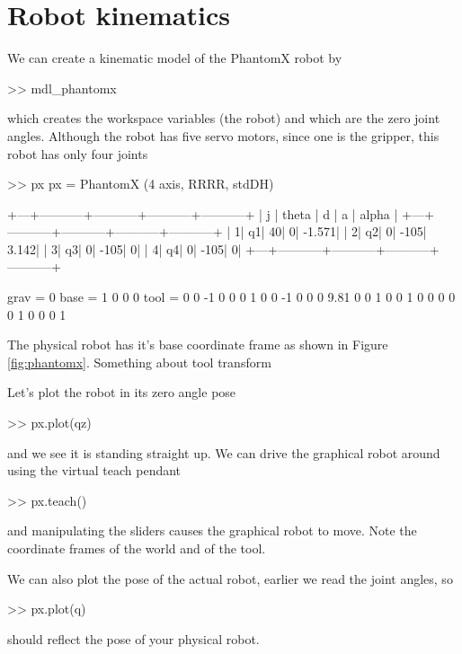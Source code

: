 \documentclass[11pt]{article}
\begin{document}
\section{Robot kinematics}
We can create a kinematic model of the PhantomX robot by
\begin{Code}
>> mdl_phantomx
\end{Code}
which creates the workspace variables  (the robot) and  which are the zero joint angles.
Although the robot has five servo motors, since one is the gripper, this robot has only four joints
\begin{Code}
>> px
px = 
PhantomX (4 axis, RRRR, stdDH)                       
                                                     
+---+-----------+-----------+-----------+-----------+
| j |     theta |         d |         a |     alpha |
+---+-----------+-----------+-----------+-----------+
|  1|         q1|         40|          0|     -1.571|
|  2|         q2|          0|       -105|      3.142|
|  3|         q3|          0|       -105|          0|
|  4|         q4|          0|       -105|          0|
+---+-----------+-----------+-----------+-----------+
                                                     
grav =    0  base = 1  0  0  0   tool =   0  0 -1  0 
          0         0  1  0  0           -1  0  0  0 
       9.81         0  0  1  0            0  1  0  0 
                    0  0  0  1            0  0  0  1
\end{Code}
The physical robot has it's base coordinate frame as shown in Figure \ref{fig:phantomx}.
Something about tool transform

Let's plot the robot in its zero angle pose
\begin{Code}
>> px.plot(qz)
\end{Code}
and we see it is standing straight up.
We can drive the graphical robot around using the virtual teach pendant
\begin{Code}
>> px.teach()
\end{Code}
and manipulating the sliders causes the graphical robot to move.  Note the coordinate frames of the world and 
of the tool.

We can also plot the pose of the actual robot, earlier we read the joint angles, so
\begin{Code}
>> px.plot(q)
\end{Code}
should reflect the pose of your physical robot.

                    
\end{document}
